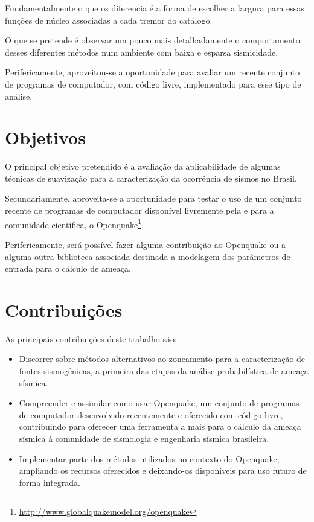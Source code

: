 Fundamentalmente o que os diferencia é a forma de escolher a largura para essas
funções de núcleo associadas a cada tremor do catálogo.

O que se pretende é observar um pouco mais detalhadamente o comportamento
desses diferentes métodos num ambiente com baixa e esparsa sismicidade.

Perifericamente, aproveitou-se a oportunidade para avaliar um recente
conjunto de programas de computador, com código livre, implementado para esse tipo de análise.
 

\section{Objetivos}
\label{sec:objetivo}

O principal objetivo pretendido é a avaliação da
aplicabilidade de algumas técnicas de suavização para a
caracterização da ocorrência de sismos no Brasil.

Secundariamente, aproveita-se a oportunidade para testar o uso de um conjunto
recente de programas de computador disponível livremente pela e para a comunidade
científica, o Openquake\footnote{\url{http://www.globalquakemodel.org/openquake}}. 

Perifericamente, será possível fazer alguma contribuição ao Openquake
ou a alguma outra biblioteca associada destinada a modelagem dos parâmetros de entrada
para o cálculo de ameaça.

\section{Contribuições}
\label{sec:contribucoes}

As principais contribuições deste trabalho são:

\begin{itemize}
  \item Discorrer sobre métodos alternativos ao zoneamento para a caracterização de fontes
  sismogênicas, a primeira das etapas da análise probabilística de ameaça 
  sísmica.

  \item Compreender e assimilar como usar Openquake, um conjunto de programas de
  computador desenvolvido recentemente e oferecido com código livre, contribuindo
  para oferecer uma ferramenta a mais para o cálculo da ameaça sísmica à comunidade
  de sismologia e engenharia sísmica brasileira.
  
  \item Implementar parte dos métodos utilizados no contexto do
  Openquake, ampliando os recursos oferecidos e deixando-os disponíveis
  para uso futuro de forma integrada.

\end{itemize}

